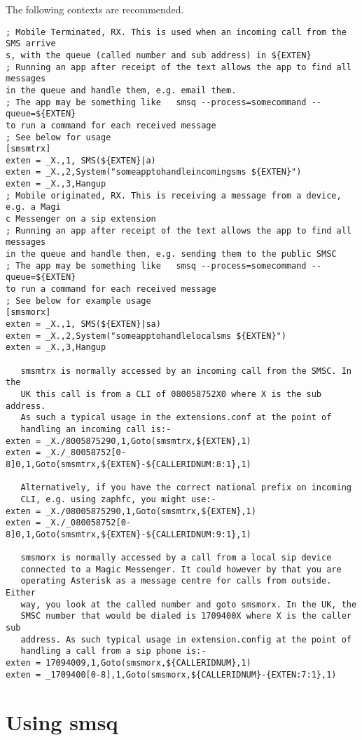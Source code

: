    The following contexts are recommended.
\begin{verbatim}
; Mobile Terminated, RX. This is used when an incoming call from the SMS arrive
s, with the queue (called number and sub address) in ${EXTEN}
; Running an app after receipt of the text allows the app to find all messages 
in the queue and handle them, e.g. email them.
; The app may be something like   smsq --process=somecommand --queue=${EXTEN}  
to run a command for each received message
; See below for usage
[smsmtrx]
exten = _X.,1, SMS(${EXTEN}|a)
exten = _X.,2,System("someapptohandleincomingsms ${EXTEN}")
exten = _X.,3,Hangup
; Mobile originated, RX. This is receiving a message from a device, e.g. a Magi
c Messenger on a sip extension
; Running an app after receipt of the text allows the app to find all messages 
in the queue and handle then, e.g. sending them to the public SMSC
; The app may be something like   smsq --process=somecommand --queue=${EXTEN}  
to run a command for each received message
; See below for example usage
[smsmorx]
exten = _X.,1, SMS(${EXTEN}|sa)
exten = _X.,2,System("someapptohandlelocalsms ${EXTEN}")
exten = _X.,3,Hangup

   smsmtrx is normally accessed by an incoming call from the SMSC. In the
   UK this call is from a CLI of 080058752X0 where X is the sub address.
   As such a typical usage in the extensions.conf at the point of
   handling an incoming call is:-
exten = _X./8005875290,1,Goto(smsmtrx,${EXTEN},1)
exten = _X./_80058752[0-8]0,1,Goto(smsmtrx,${EXTEN}-${CALLERIDNUM:8:1},1)

   Alternatively, if you have the correct national prefix on incoming
   CLI, e.g. using zaphfc, you might use:-
exten = _X./08005875290,1,Goto(smsmtrx,${EXTEN},1)
exten = _X./_080058752[0-8]0,1,Goto(smsmtrx,${EXTEN}-${CALLERIDNUM:9:1},1)

   smsmorx is normally accessed by a call from a local sip device
   connected to a Magic Messenger. It could however by that you are
   operating Asterisk as a message centre for calls from outside. Either
   way, you look at the called number and goto smsmorx. In the UK, the
   SMSC number that would be dialed is 1709400X where X is the caller sub
   address. As such typical usage in extension.config at the point of
   handling a call from a sip phone is:-
exten = 17094009,1,Goto(smsmorx,${CALLERIDNUM},1)
exten = _1709400[0-8],1,Goto(smsmorx,${CALLERIDNUM}-{EXTEN:7:1},1)
\end{verbatim}

\section{Using smsq}

